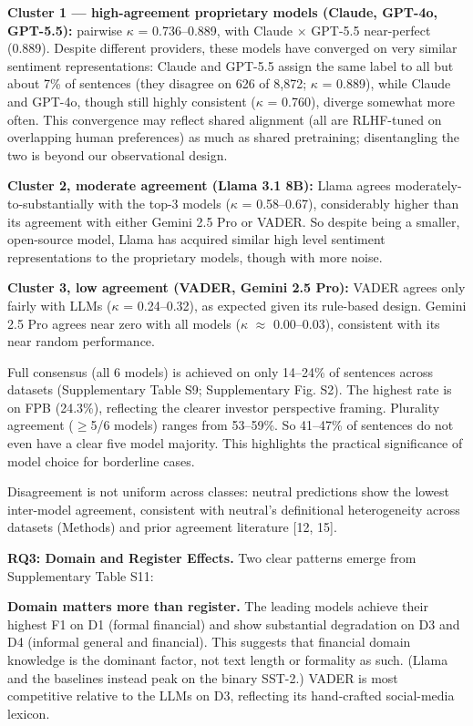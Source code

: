 \documentclass[11pt]{article}
\begin{document}
\textbf{Cluster 1 --- high-agreement proprietary models (Claude, GPT-4o,
GPT-5.5):} pairwise $\kappa$ = 0.736--0.889, with Claude $\times$ GPT-5.5 near-perfect
(0.889). Despite different providers, these models have converged on
very similar sentiment representations: Claude and GPT-5.5 assign the
same label to all but about 7\% of sentences (they disagree on 626 of
8,872; $\kappa$ = 0.889), while Claude and GPT-4o, though still highly
consistent ($\kappa$ = 0.760), diverge somewhat more often. This convergence
may reflect shared alignment (all are RLHF-tuned on overlapping human
preferences) as much as shared pretraining; disentangling the two is
beyond our observational design.

\textbf{Cluster 2, moderate agreement (Llama 3.1 8B):} Llama agrees
moderately-to-substantially with the top-3 models ($\kappa$ = 0.58--0.67),
considerably higher than its agreement with either Gemini 2.5 Pro or
VADER. So despite being a smaller, open-source model, Llama has acquired
similar high level sentiment representations to the proprietary models,
though with more noise.

\textbf{Cluster 3, low agreement (VADER, Gemini 2.5 Pro):} VADER agrees
only fairly with LLMs ($\kappa$ = 0.24--0.32), as expected given its rule-based
design. Gemini 2.5 Pro agrees near zero with all models ($\kappa$ $\approx$
0.00--0.03), consistent with its near random performance.

Full consensus (all 6 models) is achieved on only 14--24\% of sentences
across datasets (Supplementary Table S9; Supplementary Fig. S2). The
highest rate is on FPB (24.3\%), reflecting the clearer investor
perspective framing. Plurality agreement ($\geq$5/6 models) ranges from
53--59\%. So 41--47\% of sentences do not even have a clear five model
majority. This highlights the practical significance of model choice for
borderline cases.

Disagreement is not uniform across classes: neutral predictions show the
lowest inter-model agreement, consistent with neutral's definitional
heterogeneity across datasets (Methods) and prior agreement literature
{[}12, 15{]}.

\textbf{RQ3: Domain and Register Effects.} Two clear patterns emerge
from Supplementary Table S11:

\textbf{Domain matters more than register.} The leading models achieve
their highest F1 on D1 (formal financial) and show substantial
degradation on D3 and D4 (informal general and financial). This suggests
that financial domain knowledge is the dominant factor, not text length
or formality as such. (Llama and the baselines instead peak on the
binary SST-2.) VADER is most competitive relative to the LLMs on D3,
reflecting its hand-crafted social-media lexicon.
\end{document}

